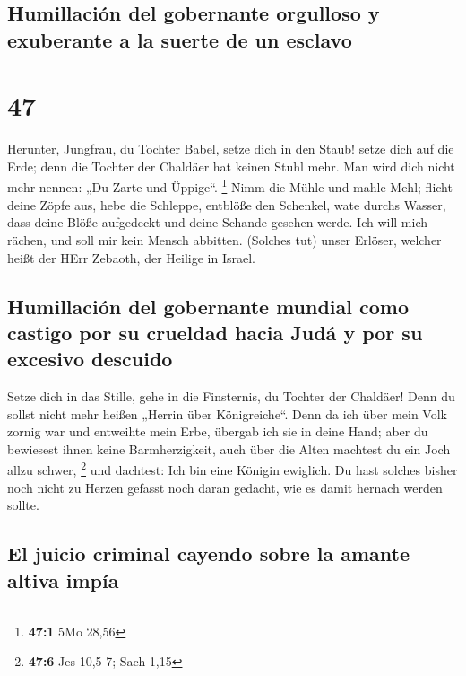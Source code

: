 \hypertarget{humillaciuxf3n-del-gobernante-orgulloso-y-exuberante-a-la-suerte-de-un-esclavo}{%
\subsection{Humillación del gobernante orgulloso y exuberante a la
suerte de un
esclavo}\label{humillaciuxf3n-del-gobernante-orgulloso-y-exuberante-a-la-suerte-de-un-esclavo}}

\hypertarget{section-46}{%
\section{47}\label{section-46}}

 Herunter, Jungfrau, du Tochter Babel, setze dich in den
Staub! setze dich auf die Erde; denn die Tochter der Chaldäer hat keinen
Stuhl mehr. Man wird dich nicht mehr nennen: „Du Zarte und Üppige``.
\footnote{\textbf{47:1} 5Mo 28,56}  Nimm die Mühle und
mahle Mehl; flicht deine Zöpfe aus, hebe die Schleppe, entblöße den
Schenkel, wate durchs Wasser,  dass deine Blöße aufgedeckt
und deine Schande gesehen werde. Ich will mich rächen, und soll mir kein
Mensch abbitten.  (Solches tut) unser Erlöser, welcher
heißt der HErr Zebaoth, der Heilige in Israel.

\hypertarget{humillaciuxf3n-del-gobernante-mundial-como-castigo-por-su-crueldad-hacia-juduxe1-y-por-su-excesivo-descuido}{%
\subsection{Humillación del gobernante mundial como castigo por su
crueldad hacia Judá y por su excesivo
descuido}\label{humillaciuxf3n-del-gobernante-mundial-como-castigo-por-su-crueldad-hacia-juduxe1-y-por-su-excesivo-descuido}}

 Setze dich in das Stille, gehe in die Finsternis, du
Tochter der Chaldäer! Denn du sollst nicht mehr heißen „Herrin über
Königreiche``.  Denn da ich über mein Volk zornig war und
entweihte mein Erbe, übergab ich sie in deine Hand; aber du bewiesest
ihnen keine Barmherzigkeit, auch über die Alten machtest du ein Joch
allzu schwer, \footnote{\textbf{47:6} Jes 10,5-7; Sach 1,15}
 und dachtest: Ich bin eine Königin ewiglich. Du hast
solches bisher noch nicht zu Herzen gefasst noch daran gedacht, wie es
damit hernach werden sollte.

\hypertarget{el-juicio-criminal-cayendo-sobre-la-amante-altiva-impuxeda}{%
\subsection{El juicio criminal cayendo sobre la amante altiva
impía}\label{el-juicio-criminal-cayendo-sobre-la-amante-altiva-impuxeda}}

